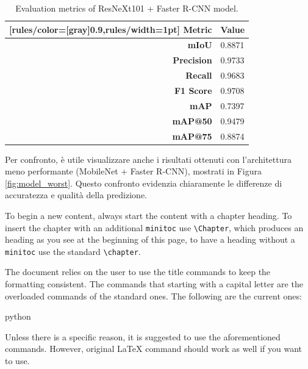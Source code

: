 \documentclass[minted, draw]{../tex/hebdomon}
\begin{document}
%
\begin{table}[H]
	\begin{NiceTabular}{rX}[rules/color=[gray]{0.9},rules/width=1pt]
		\CodeBefore
		\Body
		\toprule
		\textbf{Metric}      & \textbf{Value}                                \\
		\midrule
		\textbf{mIoU} & 0.8871 \\
		\textbf{Precision} & 0.9733 \\
		\textbf{Recall} & 0.9683 \\
		\textbf{F1 Score} & 0.9708 \\
		\midrule
		\textbf{mAP} & 0.7397 \\
		\textbf{mAP@50} & 0.9479 \\
		\textbf{mAP@75} & 0.8874 \\
		\bottomrule
	\end{NiceTabular}
	\caption{Evaluation metrics of ResNeXt101 + Faster R-CNN model.}
\end{table}
%


Per confronto, è utile visualizzare anche i risultati ottenuti con l’architettura meno performante (MobileNet + Faster R-CNN), mostrati in Figura \ref{fig:model_worst}. Questo confronto evidenzia chiaramente le differenze di accuratezza e qualità della predizione.





To begin a new content, always start the content with a chapter heading. To
insert the chapter with an additional \lstinline[columns=fixed]{minitoc}
use \lstinline[columns=fixed]{\Chapter}, which produces an heading as
you see at the beginning of this page, to have a heading without
a \lstinline[columns=fixed]{minitoc} use the standard
\lstinline[columns=fixed]{\chapter}.

The document relies on the user to use the  title commands to
keep the formatting consistent. The commands that starting with a
capital letter are the overloaded commands of the standard ones.
The following are the current ones:
%
\begin{code}{python}
\end{code}
%
\begin{warning}
	Unless there is a specific reason, it is suggested to use the aforementioned
	commands. However, original LaTeX command should work as well if you want to use.
\end{warning}
\end{document}
